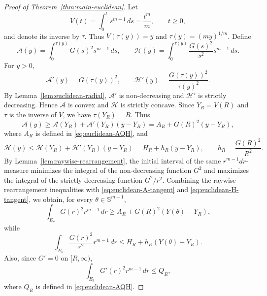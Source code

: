 \documentclass[11pt,letterpaper,reqno]{amsart}
\theoremstyle{definition}
\newcommand{\Sph}{\mathbb S}
\begin{document}
\begin{proof}[Proof of Theorem~\ref{thm:main-euclidean}]
Let
\[
        V(t)=\int_0^t s^{m-1}\,ds=\frac{t^m}{m},
        \qquad t\geq0,
\]
and denote its inverse by \(\tau\). Thus $V(\tau(y))=y$ and $\tau(y)=(my)^{1/m}$. Define
\[
\mathcal A(y)=\int_0^{\tau(y)}G(s)^2s^{m-1}\,ds,
\qquad
\mathcal H(y)=\int_0^{\tau(y)}\frac{G(s)^2}{s^2}s^{m-1}\,ds.
\]
For \(y>0\),
\[
\mathcal A'(y)=G(\tau(y))^2,
\qquad
\mathcal H'(y)=\frac{G(\tau(y))^2}{\tau(y)^2}.
\]
By Lemma~\ref{lem:euclidean-radial}, \(\mathcal A'\) is non-decreasing and
\(\mathcal H'\) is strictly decreasing. Hence \(\mathcal A\) is convex and
\(\mathcal H\) is strictly concave. Since \(Y_R=V(R)\) and \(\tau\) is the inverse of \(V\), we have \(\tau(Y_R)=R\). Thus
\begin{equation}\label{eq:euclidean-A-tangent}
\mathcal A(y)\geq \mathcal A(Y_R) +\mathcal A'(Y_R) (y-Y_R) = A_R+G(R)^2(y-Y_R),
\end{equation}
where \(A_R\) is defined in \eqref{eq:euclidean-AQH}, and
\begin{equation}\label{eq:euclidean-H-tangent}
\mathcal H(y)\leq \mathcal H(Y_R)+\mathcal H'(Y_R) (y-Y_R) = H_R+h_R(y-Y_R),
\qquad
h_R=\frac{G(R)^2}{R^2}.
\end{equation}
By Lemma~\ref{lem:raywise-rearrangement}, the initial interval of the same
\(r^{m-1}dr\)-measure minimizes the integral of the non-decreasing
function \(G^2\) and maximizes the integral of the strictly decreasing
function \(G^2/r^2\). Combining the raywise rearrangement inequalities with \eqref{eq:euclidean-A-tangent} and \eqref{eq:euclidean-H-tangent}, we obtain, for every \(\theta\in\Sph^{m-1}\),
\begin{equation}\label{eq:euclidean-ray-M}
        \int_{E_\theta}G(r)^2r^{m-1}\,dr
        \geq A_R+G(R)^2(Y(\theta)-Y_R),
\end{equation}
while
\begin{equation}\label{eq:euclidean-ray-H}
        \int_{E_\theta}\frac{G(r)^2}{r^2}r^{m-1}\,dr
        \leq H_R+h_R(Y(\theta)-Y_R).
\end{equation}
Also, since \(G'=0\) on \([R,\infty)\),
\begin{equation}\label{eq:euclidean-ray-Q}
        \int_{E_\theta}G'(r)^2r^{m-1}\,dr
        \leq Q_R,
\end{equation}
where \(Q_R\) is defined in \eqref{eq:euclidean-AQH}.


\end{proof}
\end{document}
